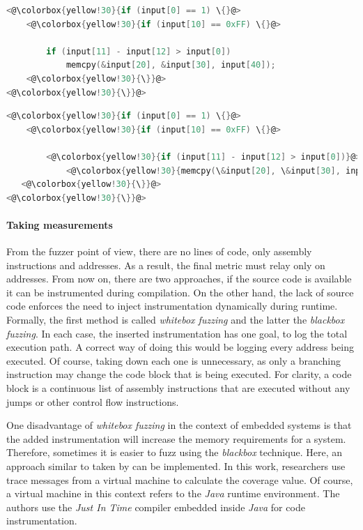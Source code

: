 \begin{minipage}\linewidth
    \begin{lstlisting}[language=C,caption={Code coverage of the first testcase.},label={lst:tc1},captionpos=b]
<@\colorbox{yellow!30}{if (input[0] == 1) \{}@>
    <@\colorbox{yellow!30}{if (input[10] == 0xFF) \{}@>

        if (input[11] - input[12] > input[0])
            memcpy(&input[20], &input[30], input[40]);
    <@\colorbox{yellow!30}{\}}@>
<@\colorbox{yellow!30}{\}}@>
    \end{lstlisting}
\end{minipage}

\begin{minipage}\linewidth
    \begin{lstlisting}[language=C,caption={Code coverage of second testcase.},label={lst:tc2},captionpos=b]
<@\colorbox{yellow!30}{if (input[0] == 1) \{}@>
    <@\colorbox{yellow!30}{if (input[10] == 0xFF) \{}@>

        <@\colorbox{yellow!30}{if (input[11] - input[12] > input[0])}@>
            <@\colorbox{yellow!30}{memcpy(\&input[20], \&input[30], input[40]);}@>
   <@\colorbox{yellow!30}{\}}@>
<@\colorbox{yellow!30}{\}}@>
    \end{lstlisting}
\end{minipage}

\paragraph{Taking measurements}
From the fuzzer point of view, there are no lines of code, only assembly instructions and addresses. As a result, the final metric must relay only on addresses. From now on, there are two approaches, if the source code is available it can be instrumented during compilation. On the other hand, the lack of source code enforces the need to inject instrumentation dynamically during runtime. Formally, the first method is called \textit{whitebox fuzzing} and the latter the \textit{blackbox fuzzing}. In each case, the inserted instrumentation has one goal, to log the total execution path. A correct way of doing this would be logging every address being executed. Of course, taking down each one is unnecessary, as only a branching instruction may change the code block that is being executed. For clarity, a code block is a continuous list of assembly instructions that are executed without any jumps or other control flow instructions. 

One disadvantage of \textit{whitebox fuzzing} in the context of embedded systems is that the added instrumentation will increase the memory requirements for a system. Therefore, sometimes it is easier to fuzz using the \textit{blackbox} technique. Here, an approach similar to taken by \cite{tracecoverage} can be implemented. In this work, researchers use trace messages from a virtual machine to calculate the coverage value. Of course, a virtual machine in this context refers to the \textit{Java} runtime environment. The authors use the \textit{Just In Time} compiler embedded inside \textit{Java} for code instrumentation.

